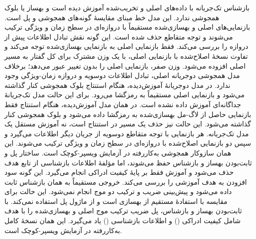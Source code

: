   بازشناس تک‌جریانه با داده‌های اصلی و تخریب‌شده آموزش دیده است و بهساز یا بلوک همجوشی ندارد. این مدل خط مبنای مقایسهٔ گونه‌های همجوشی و پل است.
  بازنمایی‌های اصلی و بهسازی‌شده مستقیماً با دروازه‌ای در سطح زمان و ویژگی ترکیب می‌شوند و توجه متقاطع حذف شده است. این گونه نقش تبادل اطلاعات پیش از دروازه را بررسی می‌کند.
  فقط بازنمایی اصلی به بازنمایی بهسازی‌شده توجه می‌کند و تفاوت نسخهٔ اصلاح‌شده با بازنمایی اصلی، با یک وزن مشترک برای کل گفتار به مسیر اصلی افزوده می‌شود. وزن صفر، بازنمایی اصلی را بدون تغییر عبور می‌دهد؛ برخلاف مدل همجوشی دوجریانه اصلی، تبادل اطلاعات دوسویه و دروازه زمان-ویژگی وجود ندارد.
  در مدل دوجریانهٔ آموزش‌دیده، هنگام استنتاج بلوک همجوشی کنار گذاشته می‌شود و بازنمایی اصلی مستقیماً به رمزگشا می‌رود. برای این حالت مدل تک‌جریانهٔ جداگانه‌ای آموزش داده نشده است.
  در همان مدل آموزش‌دیده، هنگام استنتاج فقط بازنمایی حاصل از لاگ-مل بهسازی‌شده به رمزگشا داده می‌شود و بلوک همجوشی کنار گذاشته می‌شود. این حالت نیز حذف یک مسیر در استنتاج است، نه آموزش مستقل یک مدل تک‌جریانه.
  هر بازنمایی با توجه متقاطع دوسویه از جریان دیگر اطلاعات می‌گیرد و سپس دو بازنمایی اصلاح‌شده با دروازه‌ای در سطح زمان و ویژگی ترکیب می‌شوند. این همان سازوکار همجوشی به‌کاررفته در آزمایش ویسپر-کوچک است.
  ساختار پل و ثابت‌بودن بهساز و بازشناس حفظ می‌شوند، اما مؤلفهٔ اطلاعات بازشناسی از تابع هدف حذف می‌شود و آموزش فقط بر پایهٔ کیفیت ادراکی انجام می‌گیرد. این گونه سود افزودن  به هدف آموزشی را بررسی می‌کند.
  خروجی  مستقیماً به همان بازشناس ثابت داده می‌شود و پیش‌بینی ضریب و ترکیب دو موج انجام نمی‌شود. این حالت برای مقایسه با استفادهٔ مستقیم از بهسازی است و از ماژول پل استفاده نمی‌کند.
  با ثابت‌بودن بهساز  و بازشناس، پل ضریب ترکیب موج اصلی و بهسازی‌شده را با هدف شامل کیفیت ادراکی () و اطلاعات بازشناسی () یاد می‌گیرد. این همان نسخهٔ کامل  به‌کاررفته در آزمایش ویسپر-کوچک است.

